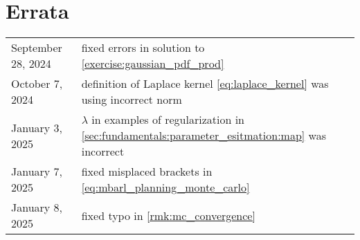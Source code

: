 \chapter{Errata}

\begin{longtable}{p{4cm}l}
  September 28, 2024 & fixed errors in solution to \cref{exercise:gaussian_pdf_prod} \\
  October 7, 2024 & definition of Laplace kernel \eqref{eq:laplace_kernel} was using incorrect norm \\
  January 3, 2025 & $\lambda$ in examples of regularization in \cref{sec:fundamentals:parameter_esitmation:map} was incorrect \\
  January 7, 2025 & fixed misplaced brackets in \cref{eq:mbarl_planning_monte_carlo} \\
  January 8, 2025 & fixed typo in \cref{rmk:mc_convergence} \\
\end{longtable}
